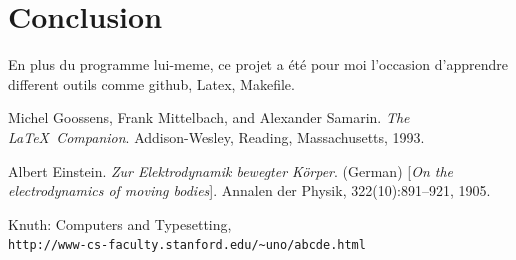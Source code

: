 \documentclass{article}
\begin{document}
\section{Conclusion}

En plus du programme lui-meme, ce projet a \'et\'e pour moi l'occasion d'apprendre different outils comme github, Latex, Makefile.



\bigskip
\bigskip

\renewcommand\refname{Ref\'erences}

\begin{thebibliography}{9}
\medskip
{} 
Michel Goossens, Frank Mittelbach, and Alexander Samarin. 
\textit{The \LaTeX\ Companion}. 
Addison-Wesley, Reading, Massachusetts, 1993.
 
Albert Einstein. 
\textit{Zur Elektrodynamik bewegter K{\"o}rper}. (German) 
[\textit{On the electrodynamics of moving bodies}]. 
Annalen der Physik, 322(10):891–921, 1905.
 
Knuth: Computers and Typesetting,
\\\texttt{http://www-cs-faculty.stanford.edu/\~{}uno/abcde.html}
\end{thebibliography}

{}

\end{document}
